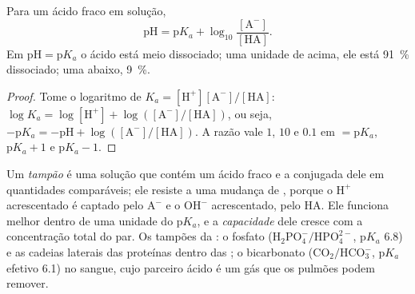 \begin{theorem}\label{thm:b1:water-small-molecules:hh}
Para um ácido fraco em solução,
\[
\mathrm{pH} = \mathrm{p}K_a + \log_{10}\frac{[\mathrm{A^-}]}{[\mathrm{HA}]} .
\]
Em $\mathrm{pH} = \mathrm{p}K_a$ o ácido está meio dissociado; uma
unidade de  acima, ele está \qty{91}{\%} dissociado; uma abaixo,
\qty{9}{\%}.
\end{theorem}
\begin{proof}
Tome o logaritmo de $K_a = [\mathrm{H^+}][\mathrm{A^-}]/[\mathrm{HA}]$:
$\log K_a = \log[\mathrm{H^+}] + \log([\mathrm{A^-}]/[\mathrm{HA}])$,
ou seja, $-\mathrm{p}K_a = -\mathrm{pH} + \log([\mathrm{A^-}]/[\mathrm{HA}])$.
A razão vale $1$, $10$ e $0.1$ em  $= \mathrm{p}K_a$, $\mathrm{p}K_a + 1$
e $\mathrm{p}K_a - 1$.
\end{proof}

\begin{definition}[Tampão]\label{def:b1:water-small-molecules:buffer}
Um \emph{tampão} é uma solução que contém um ácido fraco e
a  conjugada dele em quantidades comparáveis; ele resiste a uma
mudança de , porque o $\mathrm{H^+}$ acrescentado é captado pelo
$\mathrm{A^-}$ e o $\mathrm{OH^-}$ acrescentado, pelo $\mathrm{HA}$. Ele
funciona melhor dentro de uma unidade do p$K_a$, e a \emph{capacidade}
dele cresce com a concentração total do par. Os tampões da : o
fosfato ($\mathrm{H_2PO_4^-}/\mathrm{HPO_4^{2-}}$, p$K_a$ 6.8) e as
cadeias laterais das proteínas dentro das ; o bicarbonato
($\mathrm{CO_2}/\mathrm{HCO_3^-}$, p$K_a$ efetivo 6.1) no sangue, cujo
parceiro ácido é um gás que os pulmões podem remover.
\end{definition}

